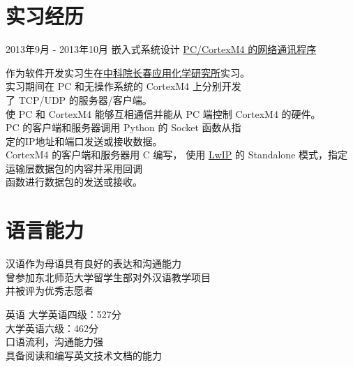 \documentclass{tccv}
\begin{document}
\section{\ShiShangZhongHeiJianTi 实习经历}

\begin{eventlist}
  

\item{\ShiShangZhongHeiJianTi 2013年9月 - 2013年10月}
  {\ShiShangZhongHeiJianTi 嵌入式系统设计}
  {\href{https://github.com/YoungLeeNENU/Cortex-M4-LED-Control}{\VeraSansYuanTi PC/CortexM4 的网络通讯程序}}

  \HiraginoSansGB
  作为软件开发实习生在\href{http://www.ciac.jl.cn/}{中科院长春应用化学研究所}实习。\\
  实习期间在 PC 和无操作系统的 CortexM4 上分别开发 \\
  了 TCP/UDP 的服务器/客户端。\\
  使 PC 和 CortexM4 能够互相通信并能从 PC 端控制 CortexM4 的硬件。\\
  PC 的客户端和服务器调用 Python 的 Socket 函数从指 \\ 
  定的IP地址和端口发送或接收数据。\\
  CortexM4 的客户端和服务器用 C 编写，
  使用 \href{http://savannah.nongnu.org/projects/lwip/}{LwIP} 的 Standalone 模式，指定运输层数据包的内容并采用回调 \\ 
  函数进行数据包的发送或接收。
\end{eventlist}

\section{\ShiShangZhongHeiJianTi 语言能力}

\begin{factlist}
\item{\HiraginoSansGB 汉语}{\HiraginoSansGB 作为母语具有良好的表达和沟通能力 \\
    曾参加东北师范大学留学生部对外汉语教学项目 \\ 
    并被评为优秀志愿者}
\item{\HiraginoSansGB 英语}{
    \HiraginoSansGB 大学英语四级：527分 \\
    \HiraginoSansGB 大学英语六级：462分 \\
    \HiraginoSansGB 口语流利，沟通能力强 \\
    \HiraginoSansGB 具备阅读和编写英文技术文档的能力
  }
\end{factlist}
\end{document}
